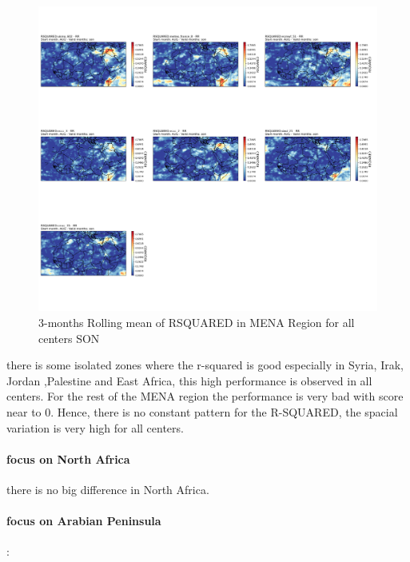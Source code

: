 \begin{figure}[H]
\includegraphics[scale=0.3]{plots/det/rsquared/rsquared_son_RR.png}
\caption{3-months Rolling mean of RSQUARED in MENA Region for all centers SON}
\end{figure}

there is some isolated zones where the r-squared is good especially in Syria, Irak, Jordan ,Palestine  and East Africa, this high performance is observed in all centers. For the rest of the MENA region the performance is very bad with score near to 0. Hence, there is no constant pattern for the R-SQUARED, the spacial variation is very high for all centers.

\paragraph{focus on North Africa}

there is no big difference in North Africa.


\vspace{1.5cm}
\paragraph{focus on Arabian Peninsula}:


